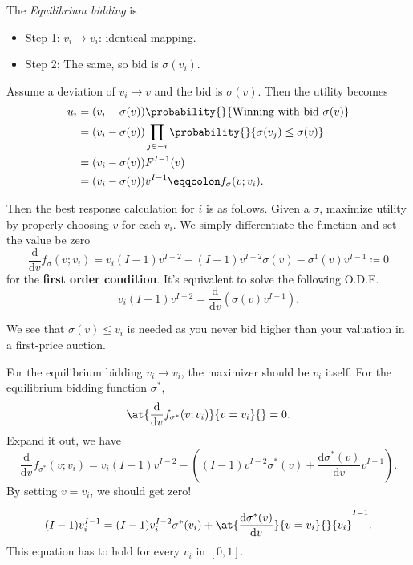 \begin{remark}
	The \emph{Equilibrium bidding} is
	\begin{itemize}
		\item Step 1: \(v_{i}\to v_{i}\): identical mapping.
		\item Step 2: The same, so bid is \(\sigma(v_{i})\).
	\end{itemize}
\end{remark}

Assume a deviation of \(v_{i}\to v\) and the bid is \(\sigma(v)\). Then the utility becomes
\[
	\begin{split}
		u_{i} &= (v_{i} - \sigma(v))\probability{}{ \text{Winning with bid } \sigma(v)}\\
		&= (v_{i} - \sigma(v))\prod\limits_{j\in -i}\probability{}{\sigma(v_{j})\leq \sigma(v)}\\
		&= (v_{i} - \sigma(v))F^{I-1}(v)\\
		&= (v_{i} - \sigma(v))v^{I-1} \eqqcolon f_{\sigma}(v; v_{i}).
	\end{split}
\]

Then the best response calculation for \(i\) is as follows. Given a \(\sigma\), maximize utility by properly choosing \(v\) for each \(v_{i}\).
We simply differentiate the function and set the value be zero
\[
	\frac{\mathrm{d}}{\mathrm{d}v}f_{\sigma}(v;v_{i}) = v_{i}(I - 1)v^{I-2} - (I - 1)v^{I-2}\sigma(v) - \sigma^1(v)v^{I-1} \coloneqq 0
\]
for the \textbf{first order condition}. It's equivalent to solve the following O.D.E.
\[
	v_{i}(I - 1)v^{I-2} = \frac{\mathrm{d}}{\mathrm{d}v} (\sigma(v)v^{I-1}).
\]

We see that \(\sigma(v)\leq v_{i}\) is needed as you never bid higher than your valuation in a first-price auction.

\hr

For the equilibrium bidding \(v_{i}\to v_{i}\), the maximizer should be \(v_{i}\) itself. For the equilibrium bidding function \(\sigma^{*}\),
\[
	\at{\frac{\mathrm{d}}{\mathrm{d}v} f_{\sigma^{*}}(v;v_{i})}{v = v_{i}}{} = 0.
\]
Expand it out, we have
\[
	\frac{\mathrm{d}}{\mathrm{d}v} f_{\sigma^{*}}(v;v_{i}) = v_{i}(I - 1)v^{I-2} - \left((I - 1)v^{I-2}\sigma^{*}(v) + \frac{\mathrm{d}\sigma^{*}(v)}{\mathrm{d}v} v^{I-1}\right).
\]
By setting \(v = v_{i}\), we should get zero!

\[
	(I - 1)v_{i}^{I-1} = (I - 1)v_{i}^{I-2}\sigma^{*}(v_{i})+\at{\frac{\mathrm{d}\sigma^{*}(v)}{\mathrm{d}v}}{v = v_{i}}{}{v_{i}}^{I-1}.
\]
This equation has to hold for every \(v_{i}\) in \([0, 1]\).

